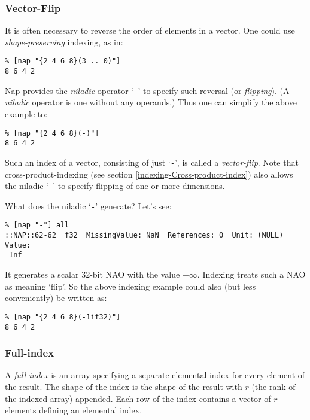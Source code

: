 \subsubsection{Vector-Flip}
    \label{indexing-Vector-flip}

  

It is often necessary to reverse the order of elements in a
  vector. One could use 
  \emph{shape-preserving} indexing, as in:
  \begin{verbatim}
% [nap "{2 4 6 8}(3 .. 0)"]
8 6 4 2
\end{verbatim}

  

Nap provides the 
  \emph{niladic} operator `\texttt{-}' to specify such reversal (or 
  \emph{flipping}). (A 
  \emph{niladic} operator is one without any operands.) Thus one can
  simplify the above example to:
  \begin{verbatim}
% [nap "{2 4 6 8}(-)"]
8 6 4 2
\end{verbatim}

  

Such an index of a vector, consisting of just `\texttt{-}', is called a 
  \emph{vector-flip}. Note that 
cross-product-indexing 
(see section \ref{indexing-Cross-product-index})
also allows
  the niladic `\texttt{-}' to specify flipping of one or more
  dimensions.
  

What does the niladic `\texttt{-}' generate? Let's see:
  \begin{verbatim}
% [nap "-"] all
::NAP::62-62  f32  MissingValue: NaN  References: 0  Unit: (NULL)
Value:
-Inf
\end{verbatim}

It generates a scalar 32-bit NAO with the value $-\infty$.
Indexing treats such a NAO as meaning `flip'.
So the above indexing example could also (but less conveniently) be written as:
  \begin{verbatim}
% [nap "{2 4 6 8}(-1if32)"]
8 6 4 2
\end{verbatim}

\subsubsection{Full-index}
    \label{indexing-Full-index}

A 
  \emph{full-index} is an array specifying a separate elemental index
  for every element of the result. The shape of the index is the shape
  of the result with 
  $r$ (the rank of the indexed array) appended. Each row of
  the index contains a vector of 
  $r$ elements defining an elemental index.
  

